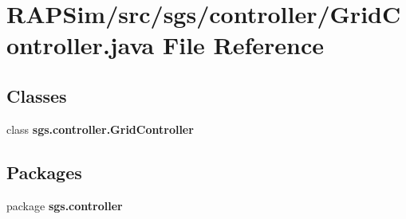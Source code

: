\section{R\-A\-P\-Sim/src/sgs/controller/\-Grid\-Controller.java File Reference}
\label{_grid_controller_8java}
\subsection*{Classes}
\begin{DoxyCompactItemize}
\item 
class {\bf sgs.\-controller.\-Grid\-Controller}
\end{DoxyCompactItemize}
\subsection*{Packages}
\begin{DoxyCompactItemize}
\item 
package {\bf sgs.\-controller}
\end{DoxyCompactItemize}
